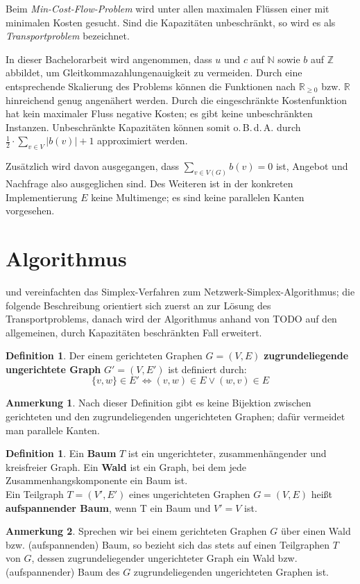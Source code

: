 \documentclass[a4paper,twoside,ngerman]{report}
\theoremstyle{plain}
\theoremstyle{definition}
\newtheorem{defn}[thm]{Definition}
\newtheorem*{anm}{Anmerkung}
\begin{document}
Beim \emph{Min-Cost-Flow-Problem} wird unter allen maximalen Flüssen einer mit minimalen Kosten gesucht. Sind die Kapazitäten unbeschränkt, so wird es als \emph{Transportproblem} bezeichnet.

In dieser Bachelorarbeit wird angenommen, dass $u$ und $c$ auf $\mathbb{N}$ sowie $b$ auf $\mathbb{Z}$ abbildet, um Gleitkommazahlungenauigkeit zu vermeiden. Durch eine entsprechende Skalierung des Problems können die Funktionen nach $\mathbb{R}_{\geq 0}$ bzw. $\mathbb{R}$ hinreichend genug angenähert werden. Durch die eingeschränkte Kostenfunktion hat kein maximaler Fluss negative Kosten; es gibt keine unbeschränkten Instanzen. Unbeschränkte Kapazitäten können somit o.\,B.\,d.\,A. durch $\frac{1}{2}\cdot\sum_{v\in V} |b(v)| + 1$ approximiert werden.

Zusätzlich wird davon ausgegangen, dass $\sum_{v\in V(G)} b(v) = 0$ ist, Angebot und Nachfrage also ausgeglichen sind. Des Weiteren ist in der konkreten Implementierung $E$ keine Multimenge; es sind keine parallelen Kanten vorgesehen.

\section{Algorithmus}
\cite[Dantzig, 1951]{erf1} und \cite[Orden, 1956]{erf2} vereinfachten das Simplex-Verfahren zum Netzwerk-Simplex-Algorithmus; die folgende Beschreibung orientiert sich zuerst an \cite[S. 291\,ff.]{NSAbook} zur Lösung des Transportproblems, danach wird der Algorithmus anhand von TODO auf den allgemeinen, durch Kapazitäten beschränkten Fall erweitert.

\begin{defn}Der einem gerichteten Graphen $G=(V,E)$ \textbf{zugrundeliegende ungerichtete Graph} $G'=(V,E')$ ist definiert durch:\\
\begin{equation*}\{v,w\}\in E' \iff (v,w) \in E \lor (w,v) \in E\end{equation*} \end{defn}
\begin{anm}Nach dieser Definition gibt es keine Bijektion zwischen gerichteten und den zugrundeliegenden ungerichteten Graphen; dafür vermeidet man parallele Kanten.\end{anm}
\begin{defn}Ein \textbf{Baum} $T$ ist ein ungerichteter, zusammenhängender und kreisfreier Graph. Ein \textbf{Wald} ist ein Graph, bei dem jede Zusammenhangskomponente ein Baum ist.\\
Ein Teilgraph $T=(V',E')$ eines ungerichteten Graphen $G=(V,E)$ heißt \textbf{aufspannender Baum}, wenn T ein Baum und $V'=V$ ist.\end{defn}
\begin{anm}Sprechen wir bei einem gerichteten Graphen $G$ über einen Wald bzw. (aufspannenden) Baum, so bezieht sich das stets auf einen Teilgraphen $T$ von $G$, dessen zugrundeliegender ungerichteter Graph ein Wald bzw. (aufspannender) Baum des $G$ zugrundeliegenden ungerichteten Graphen ist.\end{anm}
\end{document}
